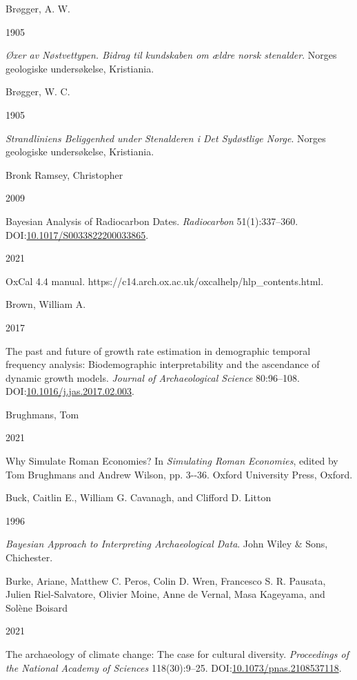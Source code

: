 \documentclass[
  12pt,
  a4paper,
  oneside]{book}
\newlength{\cslhangindent}
\newlength{\csllabelwidth}
\newlength{\cslentryspacingunit} %
\newenvironment{CSLReferences}[2] %
 {%
  \setlength{\parindent}{0pt}
  \ifodd #1
  \let\oldpar\par
  \def\par{\hangindent=\cslhangindent\oldpar}
  \fi
  \setlength{\parskip}{#2\cslentryspacingunit}
 }%
 {}
\newcommand{\CSLBlock}[1]{#1\hfill\break}
\newcommand{\CSLLeftMargin}[1]{\parbox[t]{\csllabelwidth}{#1}}
\newcommand{\CSLRightInline}[1]{\parbox[t]{\linewidth - \csllabelwidth}{#1}\break}
\begin{document}
\begin{CSLReferences}{0}{0}
\leavevmode{}%
\CSLBlock{Brøgger, A. W.}
\CSLLeftMargin{ 1905}%
\CSLRightInline{\emph{{Øxer av Nøstvettypen. Bidrag til kundskaben om ældre norsk stenalder}}. Norges geologiske undersøkelse, Kristiania.}

\leavevmode{}%
\CSLBlock{Brøgger, W. C.}
\CSLLeftMargin{ 1905}%
\CSLRightInline{\emph{{Strandliniens Beliggenhed under Stenalderen i Det Sydøstlige Norge}}. Norges geologiske undersøkelse, Kristiania.}

\leavevmode{}%
\CSLBlock{Bronk Ramsey, Christopher}
\CSLLeftMargin{ 2009}%
\CSLRightInline{Bayesian Analysis of Radiocarbon Dates. \emph{Radiocarbon} 51(1):337--360. DOI:\href{https://doi.org/10.1017/S0033822200033865}{10.1017/S0033822200033865}.}

\leavevmode{}%
\CSLLeftMargin{ 2021 }%
\CSLRightInline{OxCal 4.4 manual. https://c14.arch.ox.ac.uk/oxcalhelp/hlp\_contents.html.}

\leavevmode{}%
\CSLBlock{Brown, William A.}
\CSLLeftMargin{ 2017}%
\CSLRightInline{{The past and future of growth rate estimation in demographic temporal frequency analysis: Biodemographic interpretability and the ascendance of dynamic growth models}. \emph{Journal of Archaeological Science} 80:96--108. DOI:\href{https://doi.org/10.1016/j.jas.2017.02.003}{10.1016/j.jas.2017.02.003}.}

\leavevmode{}%
\CSLBlock{Brughmans, Tom}
\CSLLeftMargin{ 2021}%
\CSLRightInline{{Why Simulate Roman Economies?} In \emph{{Simulating Roman Economies}}, edited by Tom Brughmans and Andrew Wilson, pp. 3-\/-36. Oxford University Press, Oxford.}

\leavevmode{}%
\CSLBlock{Buck, Caitlin E., William G. Cavanagh, and Clifford D. Litton}
\CSLLeftMargin{ 1996}%
\CSLRightInline{\emph{{Bayesian Approach to Interpreting Archaeological Data}}. John Wiley \& Sons, Chichester.}

\leavevmode{}%
\CSLBlock{Burke, Ariane, Matthew C. Peros, Colin D. Wren, Francesco S. R. Pausata, Julien Riel-Salvatore, Olivier Moine, Anne de Vernal, Masa Kageyama, and Solène Boisard}
\CSLLeftMargin{ 2021}%
\CSLRightInline{The archaeology of climate change: The case for cultural diversity. \emph{Proceedings of the National Academy of Sciences} 118(30):9--25. DOI:\href{https://doi.org/10.1073/pnas.2108537118}{10.1073/pnas.2108537118}.}


\end{CSLReferences}
\end{document}
